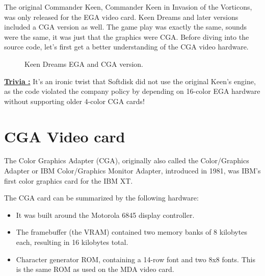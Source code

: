 \documentclass[book.tex]{subfiles}
\begin{document}
The original Commander Keen, Commander Keen in Invasion of the Vorticons, was only released for the EGA video card. Keen Dreams and later versions included a CGA version as well. The game play was exactly the same, sounds were the same, it was just that the graphics were CGA. Before diving into  the source code, let's first get a better understanding of the CGA video hardware.\\


\begin{figure}[H] 
  \centering 
  \caption{Keen Dreams EGA and CGA version.}
\end{figure}

\par
\textbf{\underline{Trivia :}} It's an ironic twist that Softdisk did not use the original Keen's engine, as the code violated the company policy by depending on 16-color EGA hardware without supporting older 4-color CGA cards!\\
\par


 

\section{CGA Video card}
The Color Graphics Adapter (CGA), originally also called the Color/Graphics Adapter or IBM Color/Graphics Monitor Adapter, introduced in 1981, was IBM's first color graphics card for the IBM XT.\\
\par
The CGA card can be summarized by the following hardware:
\begin{itemize}
  \item It was built around the Motorola 6845 display controller.
  \item The framebuffer (the VRAM) contained two memory banks of 8 kilobytes each, resulting in 16 kilobytes total.
  \item Character generator ROM, containing a 14-row font and two 8x8 fonts. This is the same ROM as used on the MDA video card.
\end{itemize}
\end{document}
